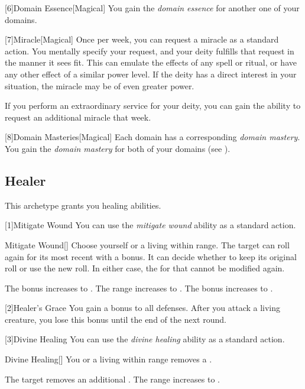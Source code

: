         [6]{Domain Essence}[Magical]
        You gain the \textit{domain essence} for another one of your domains.

        [7]{Miracle}[Magical]
        Once per week, you can request a miracle as a standard action.
        You mentally specify your request, and your deity fulfills that request in the manner it sees fit.
        This can emulate the effects of any spell or ritual, or have any other effect of a similar power level.
        If the deity has a direct interest in your situation, the miracle may be of even greater power.

        If you perform an extraordinary service for your deity, you can gain the ability to request an additional miracle that week.

        [8]{Domain Masteries}[Magical]
        Each domain has a corresponding \textit{domain mastery}.
        You gain the \textit{domain mastery} for both of your domains (see ).

    \subsection{Healer}
        This archetype grants you healing abilities.

        [1]{Mitigate Wound} You can use the \textit{mitigate wound} ability as a standard action.
        \begin{freeability}{Mitigate Wound}[]
            Choose yourself or a living  within \rngclose range.
            The target can roll again for its most recent  with a  bonus.
            It can decide whether to keep its original roll or use the new roll.
            In either case, the  for that  cannot be modified again.

            \rankline
             The bonus increases to .
             The range increases to \rnglong.
             The bonus increases to .
        \end{freeability}

        [2]{Healer's Grace} You gain a  bonus to all defenses.
        After you attack a living creature, you lose this bonus until the end of the next round.

        [3]{Divine Healing} You can use the \textit{divine healing} ability as a standard action.
        \begin{apability}{Divine Healing}[]
            You or a living  within \rngclose range removes a .

            \rankline
             The target removes an additional .
             The range increases to \rnglong.
        \end{apability}

